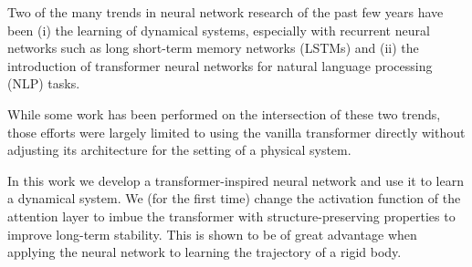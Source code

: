 Two of the many trends in neural network research of the past few years have been (i) the learning of dynamical systems, especially with recurrent neural networks such as long short-term memory networks (LSTMs) and (ii) the introduction of transformer neural networks for natural language processing (NLP) tasks. %

While some work has been performed on the intersection of these two trends, those efforts were largely limited to using the vanilla transformer directly without adjusting its architecture for the setting of a physical system.

In this work we develop a transformer-inspired neural network and use it to learn a dynamical system. We (for the first time) change the activation function of the attention layer to imbue the transformer with structure-preserving properties to improve long-term stability. This is shown to be of great advantage when applying the neural network to learning the trajectory of a rigid body.